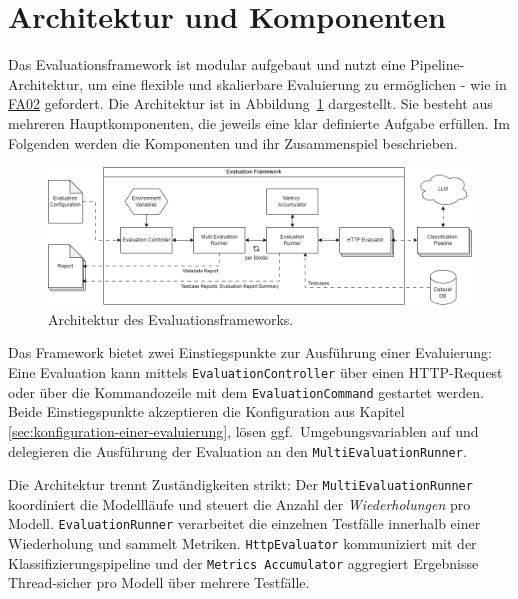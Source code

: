 \section{Architektur und Komponenten}\label{sec:architektur-und-komponenten}

Das Evaluationsframework ist modular aufgebaut und nutzt eine Pipeline-Archi\-tektur, um eine flexible und skalierbare Evaluierung zu ermöglichen - wie in \hyperlink{FA02}{FA02} gefordert. Die Architektur ist in Abbildung~\ref{fig:evaluation-framework-architecture} dargestellt. Sie besteht aus mehreren Hauptkomponenten, die jeweils eine klar definierte Aufgabe erfüllen. Im Folgenden werden die Komponenten und ihr Zusammenspiel beschrieben.

\begin{figure}[h]
    \centering
    \includegraphics[width=\linewidth]{images/evaluation/evaluation-framework-architecture.drawio}
    \caption{Architektur des Evaluationsframeworks.}
    \label{fig:evaluation-framework-architecture}
\end{figure}

Das Framework bietet zwei Einstiegspunkte zur Ausführung einer Evaluierung: Eine Evaluation kann mittels \texttt{EvaluationController} über einen HTTP-Request oder über die Kommandozeile mit dem \texttt{EvaluationCommand} gestartet werden. Beide Einstiegspunkte akzeptieren die Konfiguration aus Kapitel \ref{sec:konfiguration-einer-evaluierung}, lösen ggf.\ Umgebungsvariablen auf und delegieren die Ausführung der Evaluation an den \texttt{MultiEvaluationRunner}.

Die Architektur trennt Zuständigkeiten strikt: Der \texttt{MultiEvaluationRunner} koordiniert die Modellläufe und steuert die Anzahl der \emph{Wiederholungen} pro Modell. \texttt{EvaluationRunner} verarbeitet die einzelnen Testfälle innerhalb einer Wiederholung und sammelt Metriken. \texttt{HttpEvaluator} kommuniziert mit der Klassifizierungspipeline und der \texttt{Metrics Accumulator} aggregiert Ergebnisse Thread-sicher pro Modell über mehrere Testfälle.